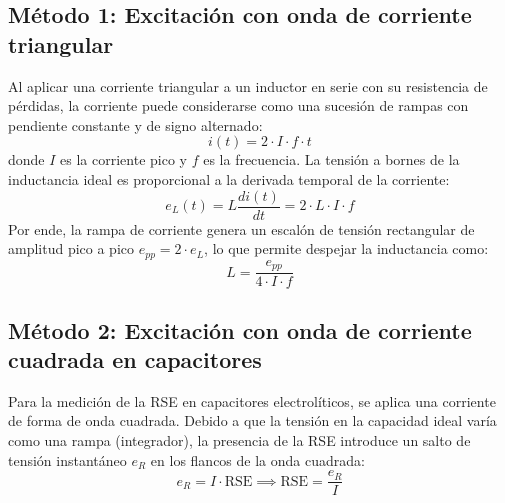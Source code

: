 \subsection{Método 1: Excitación con onda de corriente triangular}
Al aplicar una corriente triangular a un inductor en serie con su resistencia de pérdidas, la corriente puede
considerarse como una sucesión de rampas con pendiente constante y de signo alternado:
\begin{equation}
    i(t) = 2 \cdot I \cdot f \cdot t
    \label{eq.ej1:corriente_triangular}
\end{equation}
donde $I$ es la corriente pico y $f$ es la frecuencia. La tensión a bornes de la inductancia ideal es proporcional a la
derivada temporal de la corriente:
\begin{equation}
    e_L(t) = L \frac{di(t)}{dt} = 2 \cdot L \cdot I \cdot f
    \label{eq.ej1:tension_inductor}
\end{equation}
Por ende, la rampa de corriente genera un escalón de tensión rectangular de amplitud pico a pico $e_{pp} = 2 \cdot e_L$,
lo que permite despejar la inductancia como:
\begin{equation}
    L = \frac{e_{pp}}{4 \cdot I \cdot f}
    \label{eq.ej1:formula_inductancia}
\end{equation}

\subsection{Método 2: Excitación con onda de corriente cuadrada en capacitores}
Para la medición de la RSE en capacitores electrolíticos, se aplica una corriente de forma de onda cuadrada. Debido a
que la tensión en la capacidad ideal varía como una rampa (integrador), la presencia de la RSE introduce un salto de
tensión instantáneo $e_R$ en los flancos de la onda cuadrada:
\begin{equation}
    e_R = I \cdot \text{RSE} \implies \text{RSE} = \frac{e_R}{I}
    \label{eq.ej2:formula_rse}
\end{equation}

